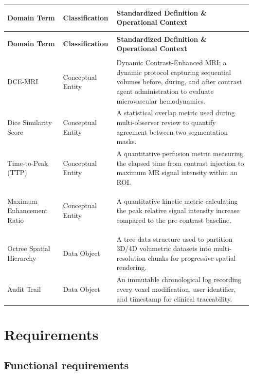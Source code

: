 \documentclass[11pt, a4paper]{article}
\begin{document}
\renewcommand{\arraystretch}{1.35}
\begin{tabularx}{\textwidth}{|>{\bfseries\raggedright\arraybackslash}p{3.6cm}|>{\raggedright\arraybackslash}p{2.9cm}|X|}
    \hline
    \textbf{Domain Term} & \textbf{Classification} & \textbf{Standardized Definition \& Operational Context} \\
    \hline
    \endfirsthead

    \hline
    \textbf{Domain Term} & \textbf{Classification} & \textbf{Standardized Definition \& Operational Context} \\
    \hline
    \endhead

    \hline
    \endlastfoot

    DCE-MRI & Conceptual Entity & Dynamic Contrast-Enhanced MRI; a dynamic protocol capturing sequential volumes before, during, and after contrast agent administration to evaluate microvascular hemodynamics. \\
    \hline
    Dice Similarity Score & Conceptual Entity & A statistical overlap metric used during multi-observer review to quantify agreement between two segmentation masks. \\
    \hline
    Time-to-Peak (TTP) & Conceptual Entity & A quantitative perfusion metric measuring the elapsed time from contrast injection to maximum MR signal intensity within an ROI. \\
    \hline
    Maximum Enhancement Ratio & Conceptual Entity & A quantitative kinetic metric calculating the peak relative signal intensity increase compared to the pre-contrast baseline. \\
    \hline
    Octree Spatial Hierarchy & Data Object & A tree data structure used to partition 3D/4D volumetric datasets into multi-resolution chunks for progressive spatial rendering. \\
    \hline
    Audit Trail & Data Object & An immutable chronological log recording every voxel modification, user identifier, and timestamp for clinical traceability. \\
\end{tabularx}

\section{Requirements}

\subsection{Functional requirements}
\end{document}
